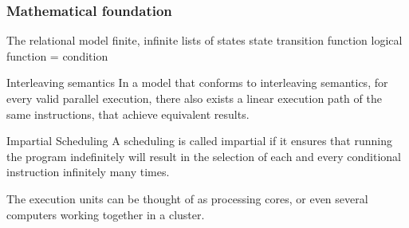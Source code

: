 \subsubsection{Mathematical foundation}

The relational model
finite, infinite lists of states
state transition function
logical function = condition


\begin{definition}{Interleaving semantics}
\label{def:interleaving-semantics}
In a model that conforms to interleaving semantics, for every valid parallel execution, there also exists a linear execution path of the same instructions, that achieve equivalent results.
\end{definition}

\begin{definition}{Impartial Scheduling}
\label{def:impartial-scheduling}
A scheduling is called impartial if it ensures that running the program indefinitely will result in the selection of each and every conditional instruction infinitely many times.
\end{definition}

The execution units can be thought of as processing cores, or even several computers working together in a cluster.

